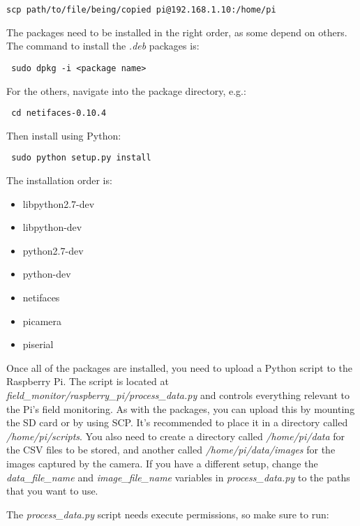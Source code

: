 \documentclass[10pt]{article}
\begin{document}
\begin{verbatim}
scp path/to/file/being/copied pi@192.168.1.10:/home/pi
\end{verbatim}

The packages need to be installed in the right order, as some depend on others. The command to install the \textit{.deb} packages is:

\begin{verbatim}
 sudo dpkg -i <package name>
\end{verbatim}

For the others, navigate into the package directory, e.g.:

\begin{verbatim}
 cd netifaces-0.10.4
\end{verbatim}

Then install using Python:

\begin{verbatim}
 sudo python setup.py install
\end{verbatim}

The installation order is:

\begin{itemize}
 \item libpython2.7-dev
 \item libpython-dev 
 \item python2.7-dev 
 \item python-dev 
 \item netifaces
 \item picamera
 \item piserial
\end{itemize}

Once all of the packages are installed, you need to upload a Python script to the Raspberry Pi. The script is located at
\textit{field\_monitor/raspberry\_pi/process\_data.py} and controls everything relevant to the Pi's field monitoring. As with the packages, you can upload this by
mounting the SD card or by using SCP. It's recommended to place it in a directory called \textit{/home/pi/scripts}. You also need to create a directory called
\textit{/home/pi/data} for the CSV files to be stored, and another called \textit{/home/pi/data/images} for the images captured by the camera. If you have a different
setup, change the \textit{data\_file\_name} and \textit{image\_file\_name} variables in \textit{process\_data.py} to the paths that you want to use.

The \textit{process\_data.py} script needs execute permissions, so make sure to run:
\end{document}
